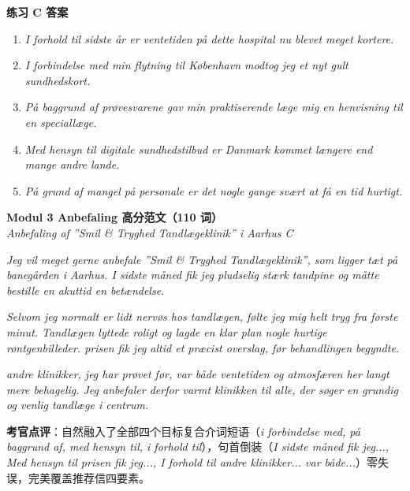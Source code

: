 \begin{answerbox}
\textbf{练习 C 答案}
\begin{enumerate}
  \item \textit{I forhold til sidste år er ventetiden på dette hospital nu blevet meget kortere.}
  \item \textit{I forbindelse med min flytning til København modtog jeg et nyt gult sundhedskort.}
  \item \textit{På baggrund af prøvesvarene gav min praktiserende læge mig en henvisning til en speciallæge.}
  \item \textit{Med hensyn til digitale sundhedstilbud er Danmark kommet længere end mange andre lande.}
  \item \textit{På grund af mangel på personale er det nogle gange svært at få en tid hurtigt.}
\end{enumerate}

\textbf{Modul 3 Anbefaling 高分范文（110 词）}\\
\textit{Anbefaling af ”Smil \& Tryghed Tandlægeklinik” i Aarhus C}

\textit{Jeg vil meget gerne anbefale ”Smil \& Tryghed Tandlægeklinik”, som ligger tæt på banegården i Aarhus. I sidste måned fik jeg pludselig stærk tandpine og måtte bestille en akuttid  en betændelse.}

\textit{Selvom jeg normalt er lidt nervøs hos tandlægen, følte jeg mig helt tryg fra første minut. Tandlægen lyttede roligt og lagde en klar plan  nogle hurtige røntgenbilleder.  prisen fik jeg altid et præcist overslag, før behandlingen begyndte.}

\textit{ andre klinikker, jeg har prøvet før, var både ventetiden og atmosfæren her langt mere behagelig. Jeg anbefaler derfor varmt klinikken til alle, der søger en grundig og venlig tandlæge i centrum.}

\small\textbf{考官点评}：自然融入了全部四个目标复合介词短语（\textit{i forbindelse med, på baggrund af, med hensyn til, i forhold til}），句首倒装（\textit{I sidste måned fik jeg..., Med hensyn til prisen fik jeg..., I forhold til andre klinikker... var både...}）零失误，完美覆盖推荐信四要素。
\end{answerbox}
